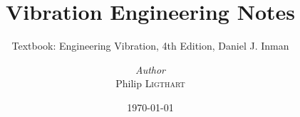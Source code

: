 \documentclass[a4paper, 12pt]{report}
\title{Vibration Engineering Notes}
\subtitle{Textbook: Engineering Vibration, 4th Edition, Daniel J. Inman}
\author{\textit{Author}\\Philip \textsc{Ligthart}}
\date{\today}
\begin{document}
    \maketitle
    \romantableofcontents

    
    
\end{document}
